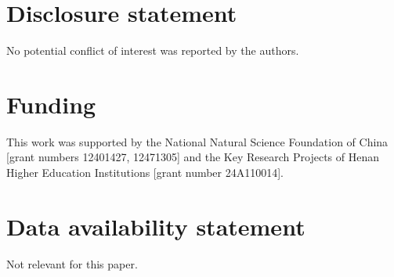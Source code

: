 \documentclass[12pt]{article}
\begin{document}
\begin{sloppypar}
\section*{Disclosure statement}
No potential conflict of interest was reported by the authors.

\section*{Funding}
This work was supported by the National Natural Science Foundation of China [grant numbers 12401427, 12471305] and the Key Research Projects of Henan Higher Education Institutions [grant number 24A110014].

\section*{Data availability statement}
Not relevant for this paper.

\end{sloppypar}


\end{document}
